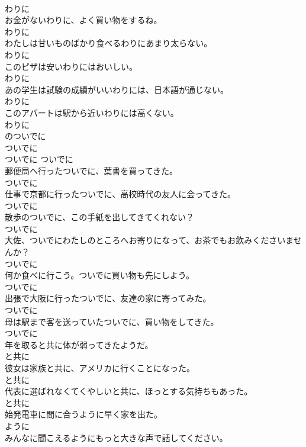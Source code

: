 \documentclass[8pt]{extreport}
\begin{document}
\begin{CJK}{UTF8}{min}
\\	わりに
\\	お金がないわりに、よく買い物をするね。	
\\	わりに
\\	わたしは甘いものばかり食べるわりにあまり太らない。	
\\	わりに
\\	このピザは安いわりにはおいしい。	
\\	わりに
\\	あの学生は試験の成績がいいわりには、日本語が通じない。	
\\	わりに
\\	このアパートは駅から近いわりには高くない。	
\\	わりに
\\	のついでに	
\\	ついでに	
\\	ついでに	ついでに
\\	郵便局へ行ったついでに、葉書を買ってきた。	
\\	ついでに
\\	仕事で京都に行ったついでに、高校時代の友人に会ってきた。	
\\	ついでに
\\	散歩のついでに、この手紙を出してきてくれない？	
\\	ついでに
\\	大佐、ついでにわたしのところへお寄りになって、お茶でもお飲みくださいませんか？	
\\	ついでに
\\	何か食べに行こう。ついでに買い物も先にしよう。	
\\	ついでに
\\	出張で大阪に行ったついでに、友達の家に寄ってみた。	
\\	ついでに
\\	母は駅まで客を送っていたついでに、買い物をしてきた。	
\\	ついでに
\\	年を取ると共に体が弱ってきたようだ。	
\\	と共に
\\	彼女は家族と共に、アメリカに行くことになった。	
\\	と共に
\\	代表に選ばれなくてくやしいと共に、ほっとする気持ちもあった。	
\\	と共に
\\	始発電車に間に合うように早く家を出た。	
\\	ように
\\	みんなに聞こえるようにもっと大きな声で話してください。	

\end{CJK}
\end{document}
